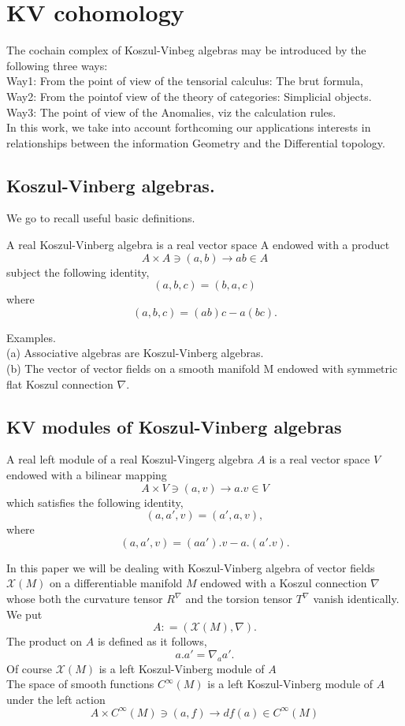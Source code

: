 \section{KV cohomology}
\label{sec:kv}
The cochain complex of Koszul-Vinbeg algebras may be introduced by the following three ways:\citep{boyom2016,Boyom2020TheLF}\\
Way1: From the point of view of the tensorial calculus: The brut formula,\\
Way2: From the pointof view of the theory of categories: Simplicial objects.\\
Way3: The point of view of the Anomalies, viz the calculation  rules.\\
In this work, we take into account forthcoming our applications interests in relationships between the information Geometry and the Differential topology.\\
\subsection{Koszul-Vinberg algebras.}
We go to recall useful basic definitions.
\begin{defn} A real Koszul-Vinberg algebra is a real vector space A endowed with a product 
$$A \times A \ni (a,b)\rightarrow ab \in A$$
subject the following identity,
$$(a,b,c) = (b,a,c)$$ 
where
$$(a,b,c) = (ab)c - a(bc).$$
\end{defn}
Examples. \\
(a) Associative algebras are Koszul-Vinberg algebras.\\
(b) The vector of vector fields on a smooth manifold M endowed with symmetric flat Koszul connection $\nabla$.\\
\subsection{KV modules of Koszul-Vinberg algebras}
\begin{defn} A real left module of a real Koszul-Vingerg algebra $A$ is a real vector space $V$ endowed with a bilinear mapping
$$A \times V \ni (a,v) \rightarrow a.v \in V$$
which satisfies the following identity,
$$(a,a',v) = (a',a,v),$$
where
$$(a, a',v) = (aa').v - a.(a'.v).$$
\end{defn}
In this paper we will be dealing with Koszul-Vinberg algebra of vector fields $\mathcal{X}(M)$ on a differentiable manifold $M$ endowed with a Koszul connection $\nabla$ whose both the curvature tensor $R^\nabla$ and the torsion tensor $T^\nabla$ vanish identically.\\
We put 
$$A : = (\mathcal{X}(M), \nabla).$$
The product on $A$ is defined as it follows,
$$a.a' =\nabla_aa'.$$
Of course $\mathcal{X}(M)$ is a left Koszul-Vinberg module of $A$\\
The space of smooth functions $C^\infty(M)$ is a left Koszul-Vinberg module of $A$ under the left action
$$A \times C^\infty(M) \ni (a,f) \rightarrow df(a) \in C^\infty(M)$$
